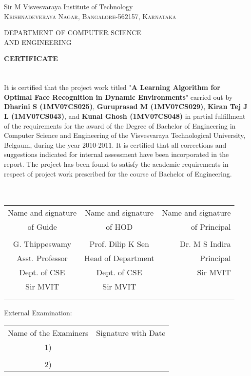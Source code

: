 \documentclass[10pt,a4paper]{article}
\newcommand{\tab}{\hspace*{1 cm}}
\begin{document}
\begin {center}
\LARGE{Sir M Visvesvaraya Institute of Technology }\\
\normalsize
\textsc{Krishnadeveraya Nagar, Bangalore-562157, Karnataka\\ }


\tab DEPARTMENT OF COMPUTER SCIENCE \\ \tab\tab AND ENGINEERING
\end{center} 

								\tab\tab\tab\tab\textup{\Large \textbf{CERTIFICATE}} \\ \\ \\

It is certified that the project work titled "\textbf{A Learning Algorithm for Optimal Face Recognition in Dynamic Environments}" carried out by \textbf{Dharini S (1MV07CS025)}, \textbf{Guruprasad M (1MV07CS029)}, \textbf{Kiran Tej J L (1MV07CS043)}, and \textbf{Kunal Ghosh (1MV07CS048)} in partial fulfillment of the requirements for the award of the Degree of Bachelor of Engineering in Computer Science and Engineering of the Visvesvaraya Technological University, Belgaum, during the year 2010-2011. It is certified that all corrections and suggestions indicated for internal assessment have been incorporated in the report. The project has been found to satisfy the academic requirements in respect of project work prescribed for the course of Bachelor of Engineering.\\ \\ \\


\begin{table}[h]
\begin{tabular}{c c r} \\
Name and signature \tab & Name and signature \tab  & Name and signature  \\
of Guide   \tab &   of HOD             \tab & \tab of Principal \\
\\ 
G. Thippeswamy \tab & Prof. Dilip K Sen \tab & Dr. M S Indira \\
Asst. Professor \tab & Head of Department \tab & Principal \\
Dept. of CSE	\tab & Dept. of CSE \tab &	Sir MVIT \\
Sir MVIT \tab & Sir MVIT \tab \\ \\ \\ 
\end{tabular}
\end{table}



External Examination:
\begin{table}[h]
\begin{tabular}{c r}
Name of the Examiners\tab \tab \tab &	Signature with Date \\
1)
\\ \\
2)
\end{tabular}
\end{table}
\end{document}
